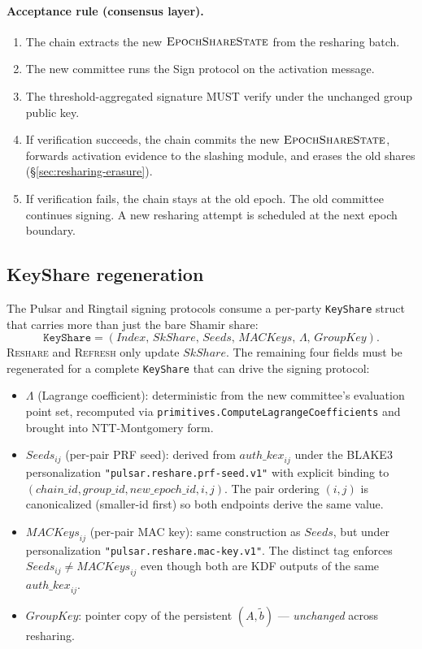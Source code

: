 \paragraph{Acceptance rule (consensus layer).}
\begin{enumerate}
\item The chain extracts the new $\textsc{EpochShareState}$ from the resharing batch.
\item The new committee runs the Sign protocol on the activation message.
\item The threshold-aggregated signature MUST verify under the unchanged group public key.
\item If verification succeeds, the chain commits the new $\textsc{EpochShareState}$, forwards activation evidence to the slashing module, and erases the old shares (\S\ref{sec:resharing-erasure}).
\item If verification fails, the chain stays at the old epoch. The old committee continues signing. A new resharing attempt is scheduled at the next epoch boundary.
\end{enumerate}

\subsection{KeyShare regeneration}
\label{sec:resharing-keyshare}

The Pulsar and Ringtail signing protocols consume a per-party \texttt{KeyShare} struct that carries more than just the bare Shamir share:
\[
  \texttt{KeyShare} = (\mathit{Index},\, \mathit{SkShare},\, \mathit{Seeds},\, \mathit{MACKeys},\, \Lambda,\, \mathit{GroupKey}).
\]
\textsc{Reshare} and \textsc{Refresh} only update $\mathit{SkShare}$. The remaining four fields must be regenerated for a complete \texttt{KeyShare} that can drive the signing protocol:

\begin{itemize}
\item $\Lambda$ (Lagrange coefficient): deterministic from the new committee's evaluation point set, recomputed via \texttt{primitives.ComputeLagrangeCoefficients} and brought into NTT-Montgomery form.

\item $\mathit{Seeds}_{ij}$ (per-pair PRF seed): derived from $\mathit{auth\_kex}_{ij}$ under the BLAKE3 personalization \texttt{"pulsar.reshare.prf-seed.v1"} with explicit binding to $(\mathit{chain\_id}, \mathit{group\_id}, \mathit{new\_epoch\_id}, i, j)$. The pair ordering $(i, j)$ is canonicalized (smaller-id first) so both endpoints derive the same value.

\item $\mathit{MACKeys}_{ij}$ (per-pair MAC key): same construction as $\mathit{Seeds}$, but under personalization \texttt{"pulsar.reshare.mac-key.v1"}. The distinct tag enforces $\mathit{Seeds}_{ij} \neq \mathit{MACKeys}_{ij}$ even though both are KDF outputs of the same $\mathit{auth\_kex}_{ij}$.

\item $\mathit{GroupKey}$: pointer copy of the persistent $(A, \tilde b)$ --- \emph{unchanged} across resharing.
\end{itemize}

